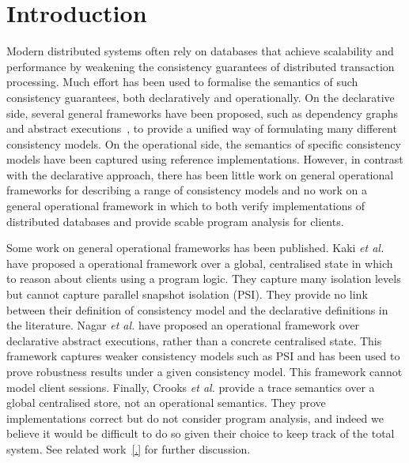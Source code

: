 \section{Introduction}

Modern distributed systems often rely on databases that achieve
scalability and performance by weakening the consistency guarantees of
distributed transaction processing.  Much effort has been used to
formalise the semantics of such consistency guarantees, both
declaratively and operationally.  On the declarative side, several
general frameworks have been proposed, such as dependency
graphs~\cite{.} and abstract executions~\cite{.}, to provide a unified
way of formulating many different consistency models.  On the
operational side, the semantics of  specific consistency models have
been captured using reference implementations. However, in contrast
with the declarative approach, there has been
little work on general operational frameworks for describing a range
of consistency models and no work on a general operational framework
in which to both verify implementations of distributed databases and 
provide scable program analysis for clients.

Some work on general operational frameworks has been published. Kaki
{\em et al.}\cite{.} have proposed a operational framework over a
global, centralised state in which to reason about clients using a
program logic. They capture many isolation levels but cannot capture
parallel snapshot isolation (PSI). They provide no link between their
definition of consistency model and the declarative definitions in the
literature. Nagar {\em et al.}\cite{.} have proposed an operational
framework over declarative abstract executions, rather than a concrete
centralised state. This framework captures weaker consistency models
such as PSI and has been used to prove robustness results under a
given consistency model.  This framework cannot model client sessions.
Finally, Crooks {\em et al.} provide a trace semantics over a global
centralised store, not an operational semantics. They prove 
implementations correct but  do not consider program analysis, and
indeed we believe it would be difficult to do so given their choice to
keep track of the total system.
See related work~\ref{.} for further discussion. 






